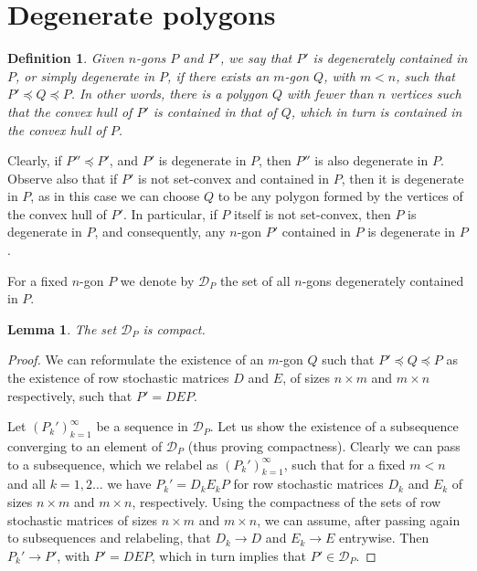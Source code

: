 \documentclass[11pt]{amsart}
\newtheorem{lemma}[theorem]{Lemma}
\newtheorem{definition}[theorem]{Definition}
\theoremstyle{remark}
\numberwithin{equation}{section}
\newcommand{\D}{\mathcal{D}}
\renewcommand{\precsim}{\preccurlyeq}
\begin{document}
\section{Degenerate polygons}\label{secdegenerate}

\begin{definition}
Given $n$-gons $P$ and $P'$,
we say that $P'$ is degenerately contained in $P$, or simply degenerate in $P$, if there exists an $m$-gon $Q$, with $m<n$, 
such that  $P'\precsim Q\precsim P$. In other words, there is a polygon $Q$ with fewer than $n$ vertices such that 
the convex hull of $P'$ is contained in that of $Q$, which in turn is contained in the convex hull of $P$.
\end{definition}

 Clearly, if $P''\precsim P'$, and $P'$ is degenerate in $P$, then $P''$ is also degenerate in $P$. Observe also that if $P'$ is not set-convex and contained in $P$, then it is degenerate in $P$, as in this case we can choose $Q$ to be any polygon formed by the vertices of the convex hull of $P'$. In particular, if $P$ itself is not set-convex, then $P$ is degenerate in $P$, and consequently, any $n$-gon $P'$ contained in $P$ is degenerate in $P$.

For a fixed $n$-gon $P$ we denote by $\mathcal D_P$ the set of all $n$-gons degenerately contained in $P$.
\begin{lemma}\label{compactD}
The set $\D_P$ is compact.
\end{lemma}
\begin{proof}
We can reformulate the existence of an $m$-gon $Q$ such that $P'\precsim Q\precsim P$ as the existence of row stochastic matrices
$D$ and $E$, of sizes $n\times m$ and $m\times n$ respectively, such that $P'=DEP$. 

Let $(P_k')_{k=1}^\infty$ be a sequence in  $\D_P$. Let us show the existence of a subsequence converging to an element of $\D_P$ (thus proving compactness). Clearly we can pass to a subsequence, which we relabel as $(P_k')_{k=1}^\infty$,  such that for a fixed $m<n$ and all $k=1,2\ldots$ we have $P_k'=D_kE_kP$ for row stochastic matrices $D_k$ and $E_k$ of sizes $n\times m$ and $m\times n$, respectively. Using the compactness of the sets of row stochastic matrices of sizes  $n\times m$ and $m\times n$, we can assume, after  passing again to subsequences and relabeling, that $D_k\to D$ and $E_k\to E$ entrywise. Then $P_k'\to P'$, with $P'=DEP$, which in turn implies that $P'\in \D_P$. 
\end{proof}
\end{document}
